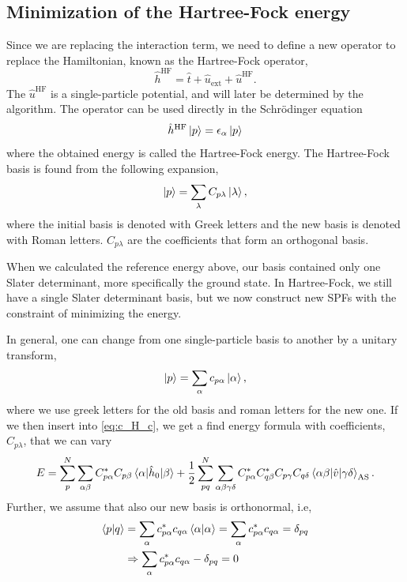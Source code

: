 \subsection{Minimization of the Hartree-Fock energy}
Since we are replacing the interaction term, we need to define a new operator to replace the Hamiltonian, known as the Hartree-Fock operator,
\begin{equation}
\hat{h}^{\text{HF}}=\hat{t} + \hat{u}_{\text{ext}} + \hat{u}^{\text{HF}}.
\end{equation}
The $\hat{u}^{\text{HF}}$ is a single-particle potential, and will later be determined by the algorithm. The operator can be used directly in the Schrödinger equation 
\begin{equation}
\hat{h}^{\text{HF}}\ket{p}=\epsilon_{\alpha}\ket{p}
\end{equation}
where the obtained energy is called the Hartree-Fock energy. The Hartree-Fock basis is found from the following expansion,
\begin{equation}
\ket{p}=\sum_{\lambda}C_{p\lambda}\ket{\lambda},
\end{equation}
where the initial basis is denoted with Greek letters and the new basis is denoted with Roman letters. $C_{p\lambda}$ are the coefficients that form an orthogonal basis. 

When we calculated the reference energy above, our basis contained only one Slater determinant, more specifically the ground state. In Hartree-Fock, we still have a single Slater determinant basis, but we now construct new SPFs with the constraint of minimizing the energy. 

In general, one can change from one single-particle basis to another by a unitary transform,
\begin{equation}
\ket{p}=\sum_{\alpha}c_{p\alpha}\ket{\alpha},
\end{equation}
where we use greek letters for the old basis and roman letters for the new one. If we then insert into \eqref{eq:c_H_c}, we get a find energy formula with coefficients, $C_{p\lambda}$, that we can vary
\begin{equation}
E=\sum_{p}^N\sum_{\alpha\beta}C_{p\alpha}^*C_{p\beta}\mel{\alpha}{\hat{h}_0}{\beta}+\frac{1}{2}
\sum_{pq}^N\sum_{\alpha\beta\gamma\delta}C_{p\alpha}^*C_{q\beta}^*C_{p\gamma}C_{q\delta}\mel{\alpha\beta}{\hat{v}}{\gamma\delta}_{\text{AS}}.
\end{equation}
Further, we assume that also our new basis is orthonormal, i.e,
\begin{align}
	\braket{p}{q}&=\sum_{\alpha}c_{p\alpha}^*c_{q\alpha}\braket{\alpha}{\alpha}=\sum_{\alpha}c_{p\alpha}^*c_{q\alpha}=\delta_{pq}\\
	&\Rightarrow\sum_{\alpha}c_{p\alpha}^*c_{q\alpha}-\delta_{pq}=0\label{eq:constraint}
\end{align}

